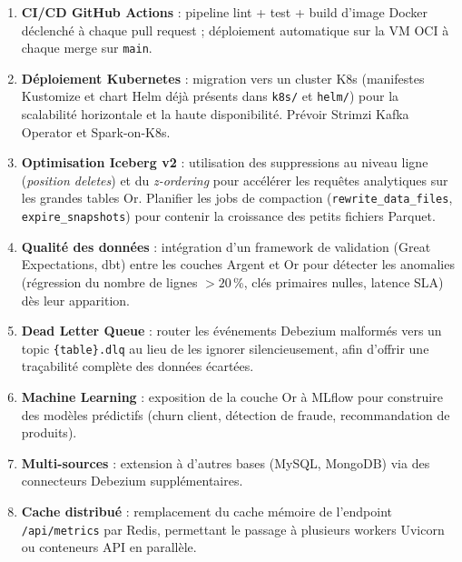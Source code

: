 \documentclass[12pt,a4paper]{report}
\begin{document}
\begin{enumerate}
    \item \textbf{CI/CD GitHub Actions} : pipeline lint + test + build
          d'image Docker déclenché à chaque pull request ; déploiement
          automatique sur la VM OCI à chaque merge sur \texttt{main}.

    \item \textbf{Déploiement Kubernetes} : migration vers un cluster K8s
          (manifestes Kustomize et chart Helm déjà présents dans \texttt{k8s/}
          et \texttt{helm/}) pour la scalabilité horizontale et la haute
          disponibilité. Prévoir Strimzi Kafka Operator et Spark-on-K8s.

    \item \textbf{Optimisation Iceberg v2} : utilisation des suppressions au
          niveau ligne (\textit{position deletes}) et du \textit{z-ordering}
          pour accélérer les requêtes analytiques sur les grandes tables Or.
          Planifier les jobs de compaction (\texttt{rewrite\_data\_files},
          \texttt{expire\_snapshots}) pour contenir la croissance des petits
          fichiers Parquet.

    \item \textbf{Qualité des données} : intégration d'un framework de
          validation (Great Expectations, dbt) entre les couches Argent et Or
          pour détecter les anomalies (régression du nombre de lignes $>20$\,\%,
          clés primaires nulles, latence SLA) dès leur apparition.

    \item \textbf{Dead Letter Queue} : router les événements Debezium
          malformés vers un topic \texttt{\{table\}.dlq} au lieu de les
          ignorer silencieusement, afin d'offrir une traçabilité complète des
          données écartées.

    \item \textbf{Machine Learning} : exposition de la couche Or à MLflow pour
          construire des modèles prédictifs (churn client, détection de fraude,
          recommandation de produits).

    \item \textbf{Multi-sources} : extension à d'autres bases (MySQL, MongoDB)
          via des connecteurs Debezium supplémentaires.

    \item \textbf{Cache distribué} : remplacement du cache mémoire de
          l'endpoint \texttt{/api/metrics} par Redis, permettant le passage à
          plusieurs workers Uvicorn ou conteneurs API en parallèle.
\end{enumerate}
\end{document}
